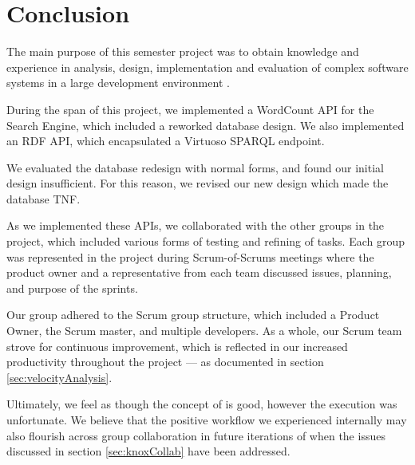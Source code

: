 \chapter{Conclusion}\label{ch:conclusion}
The main purpose of this semester project was to obtain knowledge and experience in analysis, design, implementation and evaluation of complex software systems in a large development environment \cite{AAULearningGoals5thSemester}.

During the span of this project, we implemented a WordCount API for the \knox{} Search Engine, which included a reworked database design. We also implemented an RDF API, which encapsulated a Virtuoso SPARQL endpoint.

We evaluated the database redesign with normal forms, and found our initial design insufficient. For this reason, we revised our new design which made the database TNF.

As we implemented these APIs, we collaborated with the other groups in the project, which included various forms of testing and refining of tasks. Each group was represented in the project during Scrum-of-Scrums meetings where the \knox{} product owner and a representative from each team discussed issues, planning, and purpose of the sprints.

Our group adhered to the Scrum group structure, which included a Product Owner, the Scrum master, and multiple developers.
As a whole, our Scrum team strove for continuous improvement, which is reflected in our increased productivity throughout the project --- as documented in section \ref{sec:velocityAnalysis}.

Ultimately, we feel as though the concept of \knox{} is good, however the execution was unfortunate.
We believe that the positive workflow we experienced internally may also flourish across group collaboration in future iterations of \knox{} when the issues discussed in section \ref{sec:knoxCollab} have been addressed.